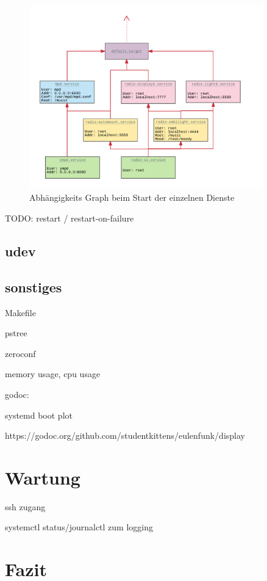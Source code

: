 \documentclass[11pt,ngerman,toc=listof,index=totoc]{scrreprt}
\begin{document}
\begin{figure}[h!]
  \centering
  \includegraphics[width=0.9\textwidth]{images/eulenfunk-systemd.png}
  \caption{Abhängigkeits Graph beim Start der einzelnen Dienste}
  \label{eulenfunk-systemd}
\end{figure}

TODO: restart / restart-on-failure

\subsection{udev}\label{udev}

\subsection{sonstiges}\label{sonstiges}

Makefile

pstree

zeroconf

memory usage, cpu usage

godoc:

systemd boot plot

https://godoc.org/github.com/studentkittens/eulenfunk/display

\section{Wartung}\label{wartung}

ssh zugang

systemctl status/journalctl zum logging

\section{Fazit}\label{fazit}
\end{document}
